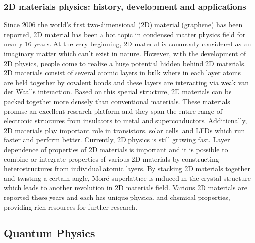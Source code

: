 \documentclass[12pt,a4paper]{article}
\begin{document}
\subsubsection{2D materials physics: history, development and applications}
Since 2006 the world's first two-dimensional (2D) material (graphene) has been reported, 2D material has been a hot topic in condensed matter physics field for nearly 16 years. At the very beginning, 2D material is commonly considered as an imaginary matter which can't exist in nature. However, with the development of 2D physics, people come to realize a huge potential hidden behind 2D materials. 2D materials consist of several atomic layers in bulk where in each layer atoms are held together by covalent bonds and these layers are interacting via weak van der Waal's interaction. Based on this special structure, 2D materials can be packed together more densely than conventional materials. These materials promise an excellent research platform and they span the entire range of electronic structures from insulators to metal and superconductors. Additionally, 2D materials play important role in transistors, solar cells, and LEDs which run faster and perform better. Currently, 2D physics is still growing fast. Layer dependence of properties of 2D materials is important and it is possible to combine or integrate properties of various 2D materials by constructing heterostructures from individual atomic layers. By stacking 2D materials together and twisting a certain angle, Moir\'{e} superlattice is induced in the crystal structure which leads to another revolution in 2D materials field. Various 2D materials are reported these years and each has unique physical and chemical properties, providing rich resources for further research.
\pagebreak

\subsection{Quantum Physics}
\end{document}
